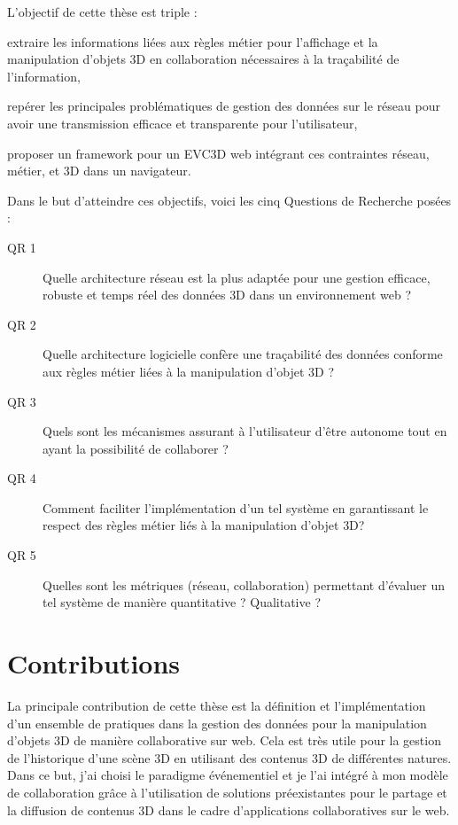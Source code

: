 L'objectif de cette thèse est triple : 
\begin{enumerate*}[label=(\roman*)]
	\item extraire les informations liées aux règles métier pour l'affichage et la 
	manipulation d'objets \gls{3D} en collaboration nécessaires à la traçabilité de 
	l'information,
	\item repérer les principales problématiques de gestion des données sur le 
	réseau pour avoir une transmission efficace et transparente pour l'utilisateur,
	\item proposer un \gls{framework} pour un \gls{EVC3D} web intégrant ces 
	contraintes réseau, métier, et \gls{3D} dans un navigateur.
\end{enumerate*}
Dans le but d'atteindre ces objectifs, voici les cinq Questions de Recherche 
posées :
\begin{description}
	\item[QR 1] Quelle architecture réseau est la plus adaptée pour une gestion 
	efficace, robuste et temps réel des données \gls{3D} dans un environnement 
	web ?
	
	\item[QR 2] Quelle architecture logicielle confère une traçabilité des données 
	conforme aux règles métier liées à la manipulation d'objet \gls{3D} ? 
	
	\item[QR 3] Quels sont les mécanismes assurant à l'utilisateur d'être 
	autonome tout en ayant la possibilité de collaborer ?
	
	
	\item[QR 4] Comment faciliter l'implémentation d'un tel système en garantissant 
	le respect des règles métier liés à la manipulation d'objet \gls{3D}?
	
	\item[QR 5] Quelles sont les métriques (réseau, collaboration) permettant 
	d'évaluer un tel système de manière quantitative ? Qualitative ? %
	
\end{description}

\section{Contributions}

La principale contribution de cette thèse est la définition et l'implémentation d'un 
ensemble de pratiques dans la gestion des données pour la manipulation d'objets 
3D de manière collaborative sur web. Cela est très utile pour la gestion de 
l'historique d'une scène \gls{3D} en utilisant des contenus \gls{3D} de différentes 
natures. Dans ce but, j'ai choisi le paradigme événementiel et je l'ai 
intégré à mon modèle de collaboration grâce à l'utilisation de solutions 
préexistantes pour le partage et la diffusion de contenus \gls{3D} dans le cadre 
d'applications collaboratives sur le web.

